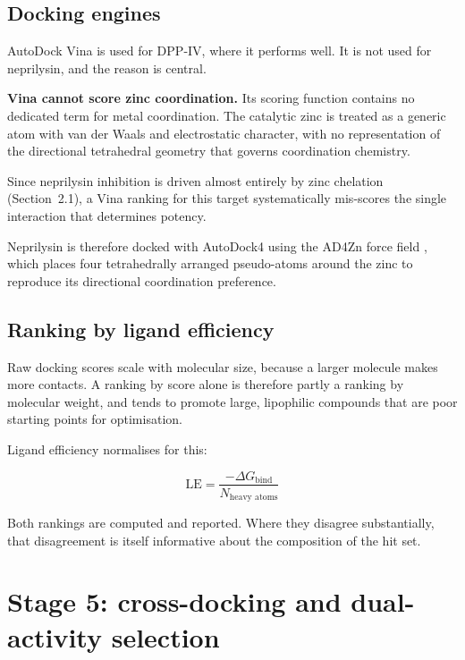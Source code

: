 \documentclass[11pt,a4paper]{article}
\begin{document}
\subsection{Docking engines}
\label{sec:zincdocking}

AutoDock Vina \cite{trott2010,eberhardt2021} is used for DPP-IV, where it
performs well. It is not used for neprilysin, and the reason is central.

\begin{warnbox}
\textbf{Vina cannot score zinc coordination.} Its scoring function contains no
dedicated term for metal coordination. The catalytic zinc is treated as a
generic atom with van der Waals and electrostatic character, with no
representation of the directional tetrahedral geometry that governs
coordination chemistry.

Since neprilysin inhibition is driven almost entirely by zinc chelation
(Section~2.1), a Vina ranking for this target systematically mis-scores the
single interaction that determines potency.
\end{warnbox}

Neprilysin is therefore docked with AutoDock4 using the AD4Zn force field
\cite{santosmartins2014}, which places four tetrahedrally arranged pseudo-atoms
around the zinc to reproduce its directional coordination preference.

\subsection{Ranking by ligand efficiency}

Raw docking scores scale with molecular size, because a larger molecule makes
more contacts. A ranking by score alone is therefore partly a ranking by
molecular weight, and tends to promote large, lipophilic compounds that are poor
starting points for optimisation.

Ligand efficiency normalises for this:

\begin{equation}
\text{LE} = \frac{-\Delta G_{\text{bind}}}{N_{\text{heavy atoms}}}
\end{equation}

Both rankings are computed and reported. Where they disagree substantially, that
disagreement is itself informative about the composition of the hit set.

\section{Stage 5: cross-docking and dual-activity selection}
\end{document}

